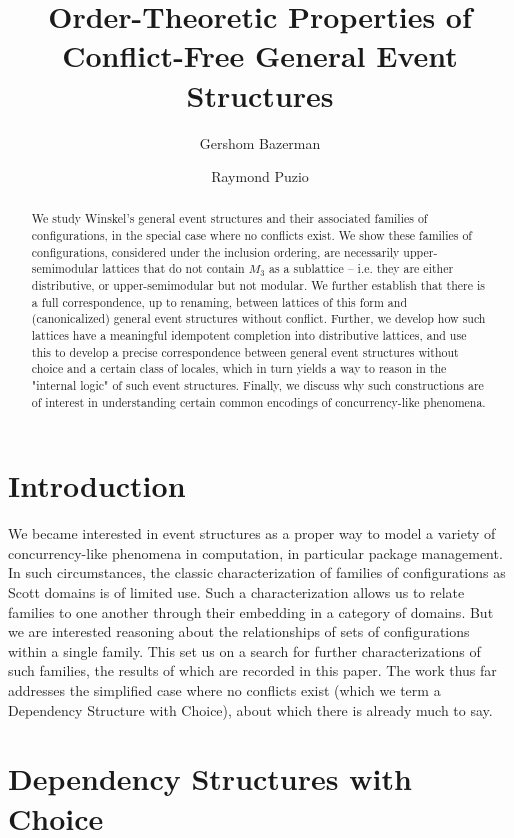 \documentclass[a4paper,USenglish,cleveref, autoref, thm-restate,authorcolumns]{lipics-v2019}
\title{Order-Theoretic Properties of Conflict-Free General Event Structures}
\author{Gershom Bazerman}{Awake Security, Santa Clara, USA}{gershomb@gmail.com}{}{}
\author{Raymond Puzio}{Albert Einstein Institute, USA}{rspuzio@gmail.com}{}{}
\begin{document}
\maketitle

\begin{abstract}
We study Winskel's general event structures and their associated families of configurations, in the special case where no conflicts exist. We show these families of configurations, considered under the inclusion ordering, are necessarily upper-semimodular lattices that do not contain \(M_3\) as a sublattice -- i.e. they are either distributive, or upper-semimodular but not modular. We further establish that there is a full correspondence, up to renaming, between lattices of this form and (canonicalized) general event structures without conflict. Further, we develop how such lattices have a meaningful idempotent completion into distributive lattices, and use this to develop a precise correspondence between general event structures without choice and a certain class of locales, which in turn yields a way to reason in the "internal logic" of such event structures. Finally, we discuss why such constructions are of interest in understanding certain common encodings of concurrency-like phenomena.
\end{abstract}


\section{Introduction}
We became interested in event structures as a proper way to model a variety of concurrency-like phenomena in computation, in particular package management. In such circumstances, the classic characterization of families of configurations as Scott domains \cite{winskel1986event} is of limited use. Such a characterization allows us to relate families to one another through their embedding in a category of domains. But we are interested reasoning about the relationships of sets of configurations within a single family. This set us on a search for further characterizations of such families, the results of which are recorded in this paper. The work thus far addresses the simplified case where no conflicts exist (which we term a Dependency Structure with Choice), about which there is already much to say.

\section{Dependency Structures with Choice}
\end{document}

